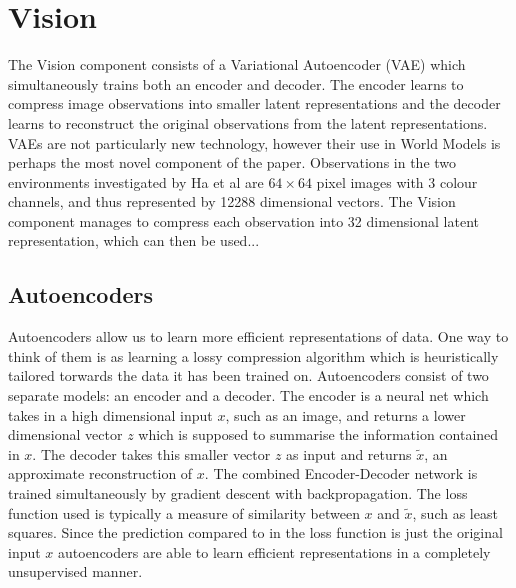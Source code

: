 \documentclass{article}
\theoremstyle{definition}
\begin{document}



\section{Vision}
The Vision component consists of a Variational Autoencoder (VAE) which simultaneously trains both an encoder and decoder.
The encoder learns to compress image observations into smaller latent representations and the decoder learns to reconstruct the original observations from the latent representations.
VAEs are not particularly new technology, however their use in World Models is perhaps the most novel component of the paper. %
Observations in the two environments investigated by Ha et al are $64 \times 64$ pixel images with 3 colour channels, and thus represented by 12288 dimensional vectors.
The Vision component manages to compress each observation into 32 dimensional latent representation, which can then be used...



\subsection{Autoencoders}
Autoencoders allow us to learn more efficient representations of data.
One way to think of them is as learning a lossy compression algorithm which is heuristically tailored torwards the data it has been trained on.
Autoencoders consist of two separate models: an encoder and a decoder.
The encoder is a neural net which takes in a high dimensional input $x$, such as an image, and returns a lower dimensional vector $z$ which is supposed to summarise the information contained in $x$.
The decoder takes this smaller vector $z$ as input and returns $\widetilde{x}$, an approximate reconstruction of $x$.
The combined Encoder-Decoder network is trained simultaneously by gradient descent with backpropagation.
The loss function used is typically a measure of similarity between $x$ and $\widetilde{x}$, such as least squares.
Since the prediction compared to in the loss function is just the original input $x$ autoencoders are able to learn efficient representations in a completely unsupervised manner.
\end{document}
